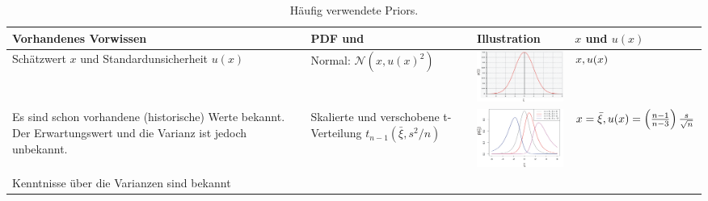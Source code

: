 \begin{table}[!htbp]
	\caption{Häufig verwendete Priors.}
	 \vspace*{1ex}
	\centering
	\begin{tabular}{m{3cm} |m{3cm} m{4.5cm}| m{3cm}}  \hline 
		Vorhandenes Vorwissen & PDF \hspace{1em} und & Illustration & $x$ und $u(x)$\\ 
		\hline \vspace*{2ex}
		Schätzwert $x$ und Standardunsicherheit $u(x)$ \vspace*{4ex} &
		Normal: $\mathcal{N} (x, u(x)^2)$ & 
				\includegraphics[width=40mm]{08_vorlesung/media/Prior_Normalverteilung.png}
	 & $x,\newline u(x)$ \\
	 \hline \vspace*{2ex}
	 Es sind schon vorhandene (historische) Werte bekannt. Der Erwartungswert und die Varianz ist jedoch unbekannt. \vspace*{4ex} &
	 Skalierte und \newline verschobene t-Verteilung $t_{n-1}(\bar \xi, s^2/n)$ & 
	 \includegraphics[width=40mm]{08_vorlesung/media/Prior_Studentverteilung.png}
	 & $x = \bar \xi, \newline u(x) = \left(\frac{n-1}{n-3}\right) \frac{s}{\sqrt{n}}$ \\
	 \hline \vspace*{6ex}
	 Kenntnisse über die Varianzen sind bekannt \vspace*{4ex} &
	

\end{tabular}
\end{table}
